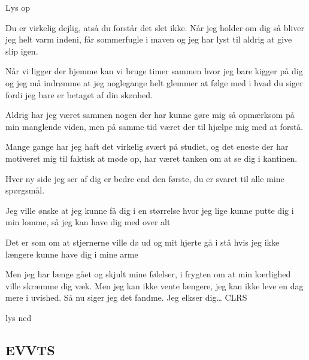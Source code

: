 \documentclass{article}
\begin{document}
\newpage%
\begin{sketch}

\scene Lys op



Du er virkelig dejlig, atså du forstår det slet ikke. Når jeg holder om dig så bliver jeg helt varm indeni, får sommerfugle i maven og jeg har lyst til aldrig at give slip igen. 

Når vi ligger der hjemme kan vi bruge timer sammen hvor jeg bare kigger på dig og jeg må indrømme at jeg noglegange helt glemmer at følge med i hvad du siger fordi jeg bare er betaget af din skønhed. 

Aldrig har jeg været sammen nogen der har kunne gøre mig så opmærksom på min manglende viden, men på samme tid været der til hjælpe mig med at forstå. 


Mange gange har jeg haft det virkelig svært på studiet, og det eneste der har motiveret mig til faktisk at møde op, har været tanken om at se dig i kantinen.

 Hver ny side jeg ser af dig er bedre end den første, du er svaret til alle mine spørgsmål.

Jeg ville ønske at jeg kunne få dig i en størrelse hvor jeg lige kunne putte dig i min lomme, så jeg kan have dig med over alt


 Det er som om at stjernerne ville dø ud og mit hjerte gå i stå hvis jeg ikke længere kunne have dig i mine arme





Men jeg har længe gået og skjult mine følelser, i frygten om at min kærlighed ville skræmme dig væk. Men jeg kan ikke vente længere, jeg kan ikke leve en dag mere i uvished. Så nu siger jeg det fandme. Jeg elkser dig… CLRS

\scene lys ned



\newpage

\subsection{EVVTS}


\end{sketch}
\end{document}

